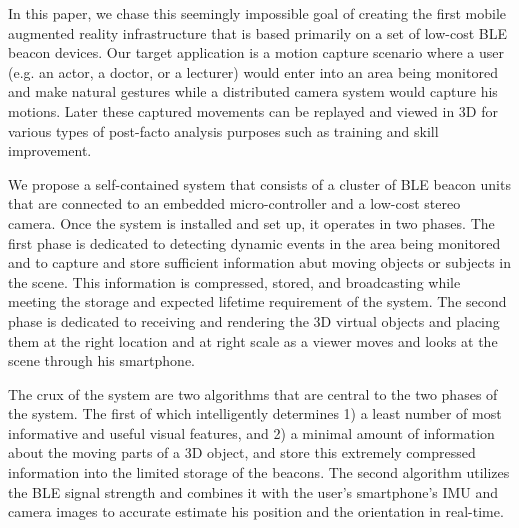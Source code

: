 In this paper, we chase this seemingly impossible goal of creating the first mobile augmented reality infrastructure that is based primarily on a set of low-cost BLE beacon devices. Our target application is a motion capture scenario where a user (e.g. an actor, a doctor, or a lecturer) would enter into an area being monitored and make natural gestures while a distributed camera system would capture his motions. Later these captured movements can be replayed and viewed in 3D for various types of post-facto analysis purposes such as training and skill improvement.

We propose a self-contained system that consists of a cluster of BLE beacon units that are connected to an embedded micro-controller and a low-cost stereo camera. Once the system is installed and set up, it operates in two phases. The first phase is dedicated to detecting dynamic events in the area being monitored and to capture and store sufficient information abut moving objects or subjects in the scene. This information is compressed, stored, and broadcasting while meeting the storage and expected lifetime requirement of the system. The second phase is dedicated to receiving and rendering the 3D virtual objects and placing them at the right location and at right scale as a viewer moves and looks at the scene through his smartphone.


The crux of the system are two algorithms that are central to the two phases of the system. The first of which intelligently determines 1) a least number of most informative and useful visual features, and 2) a minimal amount of information about the moving parts of a 3D object, and store this extremely compressed information into the limited storage of the beacons. The second algorithm utilizes the BLE signal strength and combines it with the user's smartphone's IMU and camera images to accurate estimate his position and the orientation in real-time.


